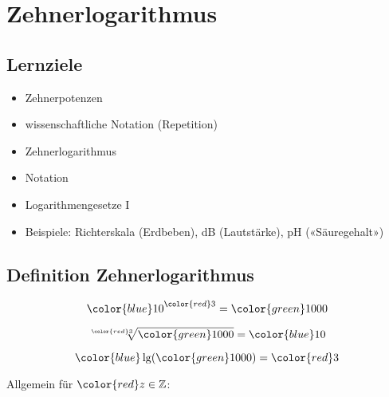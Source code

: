 
\section{Zehnerlogarithmus}


\subsection*{Lernziele}

\begin{itemize}
\item Zehnerpotenzen
\item wissenschaftliche Notation (Repetition)
\item Zehnerlogarithmus
\item Notation
\item Logarithmengesetze I
\item Beispiele: Richterskala (Erdbeben), dB (Lautstärke), pH («Säuregehalt»)
\end{itemize}
\newpage


\subsection{Definition Zehnerlogarithmus}
$${\color{blue}10}^{\color{red}3} = {\color{green}1000}$$

$$\sqrt[{\color{red}3}]{{\color{green}1000}} = {\color{blue}10}$$

$${\color{blue}\lg}({\color{green}1000}) = {\color{red}3}$$

Allgemein für ${\color{red}z}\in \mathbb{Z}$:

\begin{center}
\end{center}


